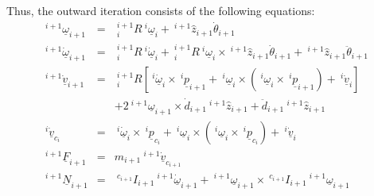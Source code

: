 \documentclass[fleqn]{article}
\begin{document}
Thus, the outward iteration consists of the following equations:
\begin{eqnarray}
	^{i+1}\underline{\omega}_{i+1} & = & \ ^{i+1}_{i}R\ ^{i}\underline{\omega}_{i} + \ ^{i+1}\hat{z}_{i+1}\dot{\theta}_{i+1} \\
	^{i+1}\underline{\dot{\omega}}_{i+1} & = & \ ^{i+1}_{i}R\ ^{i}\dot{\underline{\omega}}_{i}+\ ^{i+1}_{i}R\ ^{i}\underline{\omega}_{i}\times\ ^{i+1}\hat{z}_{i+1}\dot{\theta}_{i+1}+\ ^{i+1}\hat{z}_{i+1}\ddot{\theta}_{i+1} \\
	^{i+1}\underline{\dot{v}}_{i+1} & = & \ ^{i+1}_{i}R\left[\ ^{i}\underline{\dot{\omega}}_{i}\times\ ^{i}\underline{p}_{i+1} +\ ^{i}\underline{\omega}_{i}\times\left(\ ^{i}\underline{\omega}_{i}\times\ ^{i}\underline{p}_{i+1}\right)+\ ^{i}\underline{\dot{v}}_{i}\right] \nonumber \\
	&& + 2\ ^{i+1}\underline{\omega}_{i+1}\times\dot{d}_{i+1}\ ^{i+1}\hat{z}_{i+1} + \ddot{d}_{i+1}\ ^{i+1}\hat{z}_{i+1} \\
	^{i}\dot{\underline{v}}_{c_{i}} & = & \ ^{i}\dot{\underline{\omega}}_{i} \times \ ^{i}\underline{p}_{c_{i}}+ \ ^{i}\underline{\omega}_{i}\times\left(\ ^{i}\underline{\omega}_{i}\times\ ^{i}\underline{p}_{c_{i}}\right) + \ ^{i}\underline{\dot{v}}_{i} \nonumber \\
	^{i+1}\underline{F}_{i+1} & = & m_{i+1}\ ^{i+1}\underline{\dot{v}}_{c_{i+1}} \\
	^{i+1}\underline{N}_{i+1} & = & \ ^{c_{i+1}}I_{i+1} \ ^{i+1}\underline{\dot{\omega}}_{i+1} + \ ^{i+1}\underline{\omega}_{i+1}\times \ ^{c_{i+1}}I_{i+1}\ ^{i+1}\underline{\omega}_{i+1}
\end{eqnarray}
\end{document}
